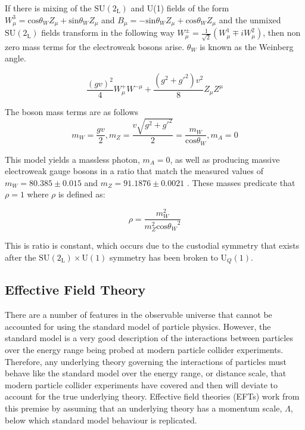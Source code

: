 If there is mixing of the $\text{SU}(2_{\text{L}})$ and U(1) fields of the form $W^{3}_{\mu} = \text{cos}{\theta_{W}}Z_{\mu} + \text{sin}{\theta_{W}}Z_{\mu}$ and $B_{\mu} = -\text{sin}{\theta_{W}}Z_{\mu} + \text{cos}{\theta_{W}}Z_{\mu}$ and the unmixed $\text{SU}(2_{\text{L}})$ fields transform in the following way $W^{\pm}_{\mu} = \frac{1}{\sqrt{2}}(W^{1}_{\mu} \mp i W^{2}_{\mu})$, then non zero mass terms for the electroweak bosons arise.  $\theta_{W}$ is known as the Weinberg angle.

\begin{equation}
\frac{(gv)^{2}}{4} W^{+}_{\mu} W^{-\mu} + \frac{(g^{2} + g'^{2})v^{2}}{8} Z_{\mu} Z^{\mu}
\end{equation}

The boson mass terms are as follows
\begin{equation}
m_{W} = \frac{gv}{2}, m_{Z} = \frac{v\sqrt{g^{2} + g'^{2}}}{2} = \frac{m_{W}}{\text{cos}{\theta_{W}}}, m_{A} = 0
\end{equation}

This model yields a massless photon, $m_{A} = 0$, as well as producing massive electroweak gauge bosons in a ratio that match the measured values of $m_{W} = 80.385 \pm 0.015$ and $m_{Z} = 91.1876 \pm 0.0021$ \cite{Beringer:1900zz}.  These masses predicate that $\rho = 1$ where $\rho$ is defined as:

\begin{equation}
\rho = \frac{m_{W}^{2}}{m_{Z}^{2}\text{cos}{\theta_{W}}^{2}}
\end{equation}

This is ratio is constant, which occurs due to the custodial symmetry that exists after the $\text{SU}(2_{\text{L}}) \times \text{U}(1)$ symmetry has been broken to $\text{U}_{Q}(1)$.

\subsection{Effective Field Theory}
There are a number of features in the observable universe that cannot be accounted for using the standard model of particle physics.  However, the standard model is a very good description of the interactions between particles over the energy range being probed at modern particle collider experiments.  Therefore, any underlying theory governing the interactions of particles must behave like the standard model over the energy range, or distance scale, that modern particle collider experiments have covered and then will deviate to account for the true underlying theory.  Effective field theories (EFTs) work from this premise by assuming that an underlying theory has a momentum scale, $\Lambda$, below which standard model behaviour is replicated.  

